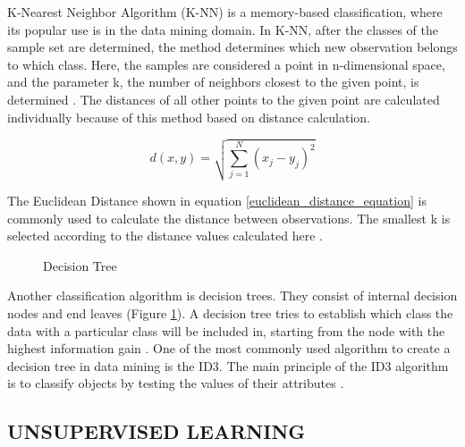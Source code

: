 K-Nearest Neighbor Algorithm (K-NN) is a memory-based classification, where its popular use is in the data mining domain. In K-NN, after the classes of the sample set are determined, the method determines which new observation belongs to which class. Here, the samples are considered a point in n-dimensional space, and the parameter k, the number of neighbors closest to the given point, is determined \cite{cover1967nearest}. The distances of all other points to the given point are calculated individually because of this method based on distance calculation. 

\begin{equation} \label{euclidean_distance_equation}
d(x,y) = \sqrt{\sum_{j=1}^{N}(x_j - y_j)^2}
\end{equation}

The Euclidean Distance shown in equation \ref{euclidean_distance_equation} is commonly used to calculate the distance between observations. The smallest k is selected according to the distance values calculated here \cite{hall2008choice}.

\begin{figure}[htbp]
\centering
{}
\caption{Decision Tree}
\label{fig:DecisionTreeExample}
\end{figure}

Another classification algorithm is decision trees. They consist of internal decision nodes and end leaves (Figure \ref{fig:DecisionTreeExample}). A decision tree tries to establish which class the data with a particular class will be included in, starting from the node with the highest information gain \cite{hssina2014comparative}. One of the most commonly used algorithm to create a decision tree in data mining is the ID3. The main principle of the ID3 algorithm is to classify objects by testing the values of their attributes \cite{jin2009improved}.

\subsection{UNSUPERVISED LEARNING}

